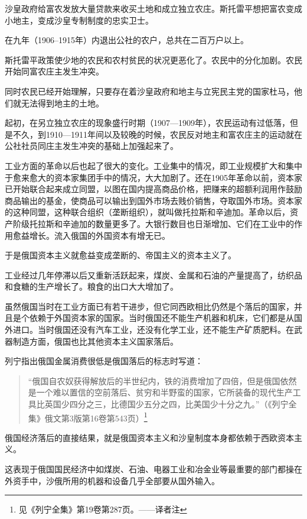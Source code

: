 沙皇政府给富农发放大量贷款来收买土地和成立独立农庄。斯托雷平想把富农变成小地主，变成沙皇专制制度的忠实卫士。

在九年（1906--1915年）内退出公社的农户，总共在二百万户以上。

斯托雷平政策使少地的农民和农村贫民的状况更恶化了。农民中的分化加剧。农民开始同富农庄主发生冲突。

同时农民已经开始理解，只要存在着沙皇政府和地主与立宪民主党的国家杜马，他们就无法得到地主的土地。

起初，在另立独立农庄的现象盛行时期（1907—1909年），农民运动有过低落，但是不久，到1910—1911年间以及较晚的时候，农民反对地主和富农庄主的运动就在公社社员同庄主发生冲突的基础上加强起来了。

工业方面的革命以后也起了很大的变化。工业集中的情况，即工业规模扩大和集中于愈来愈大的资本家集团手中的情况，大大加剧了。还在1905年革命以前，资本家已开始联合起来成立同盟，以图在国内提高商品价格，把赚来的超额利润用作鼓励商品输出的基金，使商品可以输出到国外市场去贱价销售，夺取国外市场。资本家的这种同盟，这种联合组织（垄断组织），就叫做托拉斯和辛迪加。革命以后，资产阶级托拉斯和辛迪加的数量更多了。大银行数目也日渐增加、它们在工业中的作用愈益增长。流入俄国的外国资本有增无已。

于是俄国资本主义就愈益变成垄断的、帝国主义的资本主义了。

工业经过几年停滞以后又重新活跃起来，煤炭、金属和石油的产量提高了，纺织品和食糖的生产增长了。粮食的出口大大增加了。

虽然俄国当时在工业方面已有若干进步，但它同西欧相比仍然是个落后的国家，并且是个依赖于外国资本家的国家。当时俄国还不能生产机器和机床，它们都是从国外进口。当时俄国还没有汽车工业，还没有化学工业，还不能生产矿质肥料。在武器制造方面，俄国也比其他资本主义国家落后。

列宁指出俄国金属消费很低是俄国落后的标志时写道：

\begin{quotation}
“俄国自农奴获得解放后的半世纪内，铁的消费增加了四倍，但是俄国依然是一个难以置信的空前落后、贫穷和半野蛮的国家，它所装备的现代生产工具比英国少四分之三，比德国少五分之四，比美国少十分之九。”（《列宁全集》俄文第3版第16卷第543页）\footnote{见《列宁全集》第19卷第287页。——译者注}
\end{quotation}

俄国经济落后的直接结果，就是俄国资本主义和沙皇制度本身都依赖于西欧资本主义。

这表现于俄国国民经济中如煤炭、石油、电器工业和冶金业等最重要的部门都操在外资手中，沙俄所用的机器和设备几乎全部要从国外输入。

